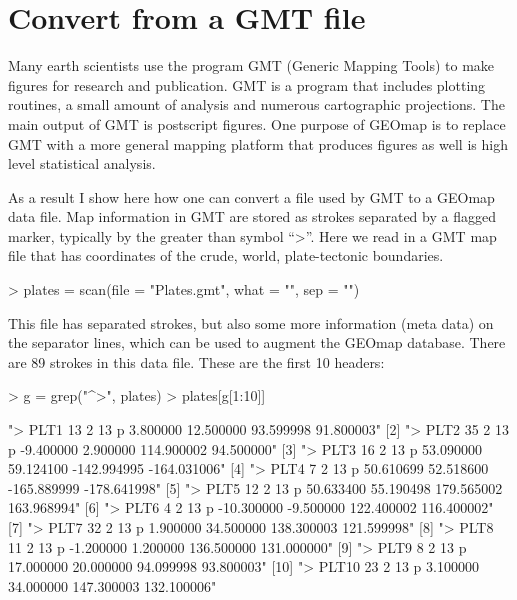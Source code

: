 \documentclass{article}
\begin{document}
\section{Convert from a GMT file}

Many earth scientists use the program GMT (Generic Mapping Tools)
 to make figures for research and publication.  
GMT is a program that includes plotting routines, a small amount of analysis and
numerous cartographic projections.  The main output of GMT is postscript 
figures.  One purpose of GEOmap is to replace GMT with a more general mapping platform
that produces figures as well is high level statistical analysis.

As a result I show here how one can convert a file used by GMT to a GEOmap data file.
Map information in GMT are stored 
as strokes separated by a flagged marker, typically 
by the greater than symbol ``>''.
Here we read in a GMT map file that 
has coordinates of the crude, world, plate-tectonic boundaries. 

\begin{Schunk}
\begin{Sinput}
> plates = scan(file = "Plates.gmt", what = "", sep = "\n")
\end{Sinput}
\end{Schunk}

This file has separated strokes, but also some more information (meta data) 
on the separator lines,
which can be used to augment the GEOmap database.
There are 89 strokes in this data file.  These are the first 
10 headers:

\begin{Schunk}
\begin{Sinput}
> g = grep("^>", plates)
> plates[g[1:10]]
\end{Sinput}
\begin{Soutput}
 [1] "> PLT1 13 2 13 p 3.800000 12.500000 93.599998 91.800003"     
 [2] "> PLT2 35 2 13 p -9.400000 2.900000 114.900002 94.500000"    
 [3] "> PLT3 16 2 13 p 53.090000 59.124100 -142.994995 -164.031006"
 [4] "> PLT4 7 2 13 p 50.610699 52.518600 -165.889999 -178.641998" 
 [5] "> PLT5 12 2 13 p 50.633400 55.190498 179.565002 163.968994"  
 [6] "> PLT6 4 2 13 p -10.300000 -9.500000 122.400002 116.400002"  
 [7] "> PLT7 32 2 13 p 1.900000 34.500000 138.300003 121.599998"   
 [8] "> PLT8 11 2 13 p -1.200000 1.200000 136.500000 131.000000"   
 [9] "> PLT9 8 2 13 p 17.000000 20.000000 94.099998 93.800003"     
[10] "> PLT10 23 2 13 p 3.100000 34.000000 147.300003 132.100006"  
\end{Soutput}
\end{Schunk}
\end{document}

